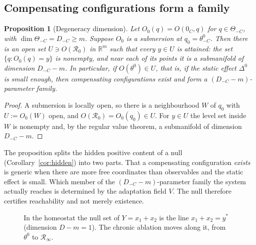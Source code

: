 \documentclass[11pt]{article}
\newtheorem{proposition}[theorem]{Proposition}
\theoremstyle{definition}
\theoremstyle{remark}
\newcommand{\R}{\mathbb{R}}
\newcommand{\Rop}{\mathcal{R}}
\begin{document}
\subsection{Compensating configurations form a family}

\begin{proposition}[Degeneracy dimension]\label{prop:degdim}
Let $O_0(q)=O(0_C,q)$ for $q\in\Theta_{-C}$, with $\dim\Theta_{-C}=D_{-C}\ge m$. Suppose $O_0$ is a submersion at $q_0=\theta^0_{-C}$. Then there is an open set $U\ni O(\Rop_0)$ in $\R^m$ such that every $y\in U$ is attained: the set $\{q:O_0(q)=y\}$ is nonempty, and near each of its points it is a submanifold of dimension $D_{-C}-m$. In particular, if $O(\theta^0)\in U$, that is, if the static effect $\Delta^0$ is small enough, then compensating configurations exist and form a $(D_{-C}-m)$-parameter family.
\end{proposition}
\begin{proof}
A submersion is locally open, so there is a neighbourhood $W$ of $q_0$ with $U:=O_0(W)$ open, and $O(\Rop_0)=O_0(q_0)\in U$. For $y\in U$ the level set inside $W$ is nonempty and, by the regular value theorem, a submanifold of dimension $D_{-C}-m$.
\end{proof}

The proposition splits the hidden positive content of a null (Corollary~\ref{cor:hidden}) into two parts. That a compensating configuration \emph{exists} is generic when there are more free coordinates than observables and the static effect is small. Which member of the $(D_{-C}-m)$-parameter family the system actually reaches is determined by the adaptation field $V$. The null therefore certifies reachability and not merely existence.

\begin{figure}[ht]
\centering
{}
\caption{In the homeostat the null set of $Y=x_1+x_2$ is the line $x_1+x_2=y^*$ (dimension $D-m=1$). The chronic ablation moves along it, from $\theta^0$ to $\mathcal R_\infty$.}
\label{fig:homeoplane}
\end{figure}
\end{document}
